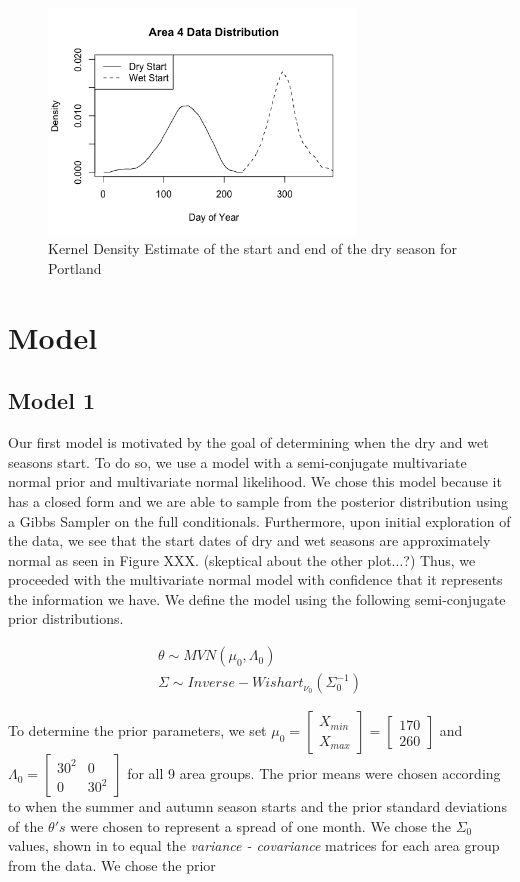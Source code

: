 \documentclass{article}
\begin{document}
\begin{figure}
\includegraphics[width = .4\textwidth, height = 6cm]{Area4DataDistribution}
\caption{Kernel Density Estimate of the start and end of the dry season for Portland}
\label{PDXexample}
\end{figure}

\section{Model}
\subsection{Model 1}
Our first model is motivated by the goal of determining when the dry and wet seasons start. To do so, we use a model with a semi-conjugate multivariate normal prior and multivariate normal likelihood. We chose this model because it has a closed form and we are able to sample from the posterior distribution using a Gibbs Sampler on the full conditionals. Furthermore, upon initial exploration of the data, we see that the start dates of dry and wet seasons are approximately normal as seen in Figure XXX. (skeptical about the other plot...?) Thus, we proceeded with the multivariate normal model with confidence that it represents the information we have. We define the model using the following semi-conjugate prior distributions. 

\begin{align*}
\theta \sim MVN(\mu_0, \Lambda_0) \\
\Sigma \sim Inverse-Wishart_{\nu_0}(\Sigma_0^{-1})
\end{align*}

To determine the prior parameters, we set $\mu_0 = \begin{bmatrix} X_{min} \\ X_{max} \end{bmatrix} = \begin{bmatrix} 170 \\ 260 \end{bmatrix}$ and $\Lambda_0 = \begin{bmatrix} 30^2 & 0 \\ 0 & 30^2 \end{bmatrix}$ for all 9 area groups. The prior means were chosen according to when the summer and autumn season starts and the prior standard deviations of the $\theta 's$ were chosen to represent a spread of one month. We chose the $\Sigma_0$ values, shown in  to equal the \textit{variance - covariance} matrices for each area group from the data. We chose the prior 
\end{document}
